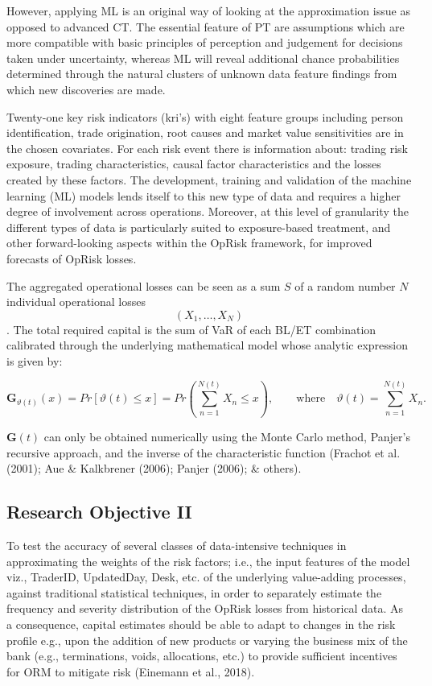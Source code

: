 \documentclass{DissertateUSU}
\begin{document}
However, applying ML is an original way of looking at the approximation
issue as opposed to advanced CT. The essential feature of PT are
assumptions which are more compatible with basic principles of
perception and judgement for decisions taken under uncertainty, whereas
ML will reveal additional chance probabilities determined through the
natural clusters of unknown data feature findings from which new
discoveries are made.\medskip

Twenty-one key risk indicators (kri's) with eight feature groups
including person identification, trade origination, root causes and
market value sensitivities are in the chosen covariates. For each risk
event there is information about: trading risk exposure, trading
characteristics, causal factor characteristics and the losses created by
these factors. The development, training and validation of the machine
learning (ML) models lends itself to this new type of data and requires
a higher degree of involvement across operations. Moreover, at this
level of granularity the different types of data is particularly suited
to exposure-based treatment, and other forward-looking aspects within
the OpRisk framework, for improved forecasts of OpRisk losses.\medskip

The aggregated operational losses can be seen as a sum \(S\) of a random
number \(N\) individual operational losses \[(X_1, \ldots, X_N )\]. The
total required capital is the sum of VaR of each BL/ET combination
calibrated through the underlying mathematical model whose analytic
expression is given by:

\singlespacing

\begin{equation}\label{eqn4}
\mathbf{G}_{\vartheta(t)}(x)=Pr[\vartheta(t)\leq x]=Pr\left(\sum_{n=1}^{N(t)}X_{n} \leq x\right), \qquad \mbox{where} \quad \vartheta(t) = \sum_{n=1}^{N(t)} X_{n}.
\end{equation} \doublespacing

\(\mathbf{G}(t)\) can only be obtained numerically using the Monte Carlo
method, Panjer's recursive approach, and the inverse of the
characteristic function (Frachot et al. (2001); Aue \& Kalkbrener
(2006); Panjer (2006); \& others).

\subsection{Research Objective II}

To test the accuracy of several classes of data-intensive techniques in
approximating the weights of the risk factors; i.e., the input features
of the model viz., TraderID, UpdatedDay, Desk, etc. of the underlying
value-adding processes, against traditional statistical techniques, in
order to separately estimate the frequency and severity distribution of
the OpRisk losses from historical data. As a consequence, capital
estimates should be able to adapt to changes in the risk profile e.g.,
upon the addition of new products or varying the business mix of the
bank (e.g., terminations, voids, allocations, etc.) to provide
sufficient incentives for ORM to mitigate risk (Einemann et al., 2018).
\end{document}
